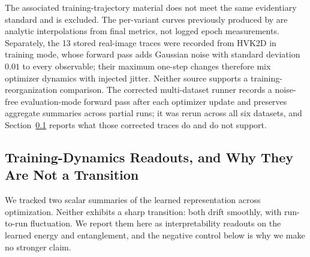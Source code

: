 \documentclass[11pt]{article}
\begin{document}
The associated training-trajectory material does not meet the same evidentiary standard and is excluded. The per-variant curves previously produced by  are analytic interpolations from final metrics, not logged epoch measurements. Separately, the 13 stored real-image traces were recorded from HVK2D in training mode, whose forward pass adds Gaussian noise with standard deviation $0.01$ to every observable; their maximum one-step changes therefore mix optimizer dynamics with injected jitter. Neither source supports a training-reorganization comparison. The corrected multi-dataset runner records a noise-free evaluation-mode forward pass after each optimizer update and preserves aggregate summaries across partial runs; it was rerun across all six datasets, and Section~\ref{sec:phase_transition} reports what those corrected traces do and do not support.

\subsection{Training-Dynamics Readouts, and Why They Are Not a Transition}
\label{sec:phase_transition}
We tracked two scalar summaries of the learned representation across optimization. Neither exhibits a sharp transition: both drift smoothly, with run-to-run fluctuation. We report them here as interpretability readouts on the learned energy and entanglement, and the negative control below is why we make no stronger claim.
\end{document}
